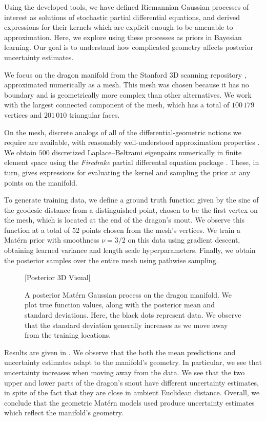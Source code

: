 \documentclass[11pt]{book}
\begin{document}
Using the developed tools, we have defined Riemannian Gaussian processes of interest as solutions of stochastic partial differential equations, and derived expressions for their kernels which are explicit enough to be amenable to approximation. 
Here, we explore using these processes as priors in Bayesian learning.
Our goal is to understand how complicated geometry affects posterior uncertainty estimates.

We focus on the dragon manifold from the Stanford 3D scanning repository \cite{curless96}, approximated numerically as a mesh.
This mesh was chosen because it has no boundary and is geometrically more complex than other alternatives.
We work with the largest connected component of the mesh, which has a total of $100\,179$ vertices and $201\,010$ triangular faces.

On the mesh, discrete analogs of all of the differential-geometric notions we require are available, with reasonably well-understood approximation properties \cite{crane17}.
We obtain $500$ discretized Laplace--Beltrami eigenpairs numerically in finite element space using the \emph{Firedrake} partial differental equation package \cite{rathgeber16}.
These, in turn, gives expressions for evaluating the kernel and sampling the prior at any points on the manifold.

To generate training data, we define a ground truth function given by the sine of the geodesic distance from a distinguished point, chosen to be the first vertex on the mesh, which is located at the end of the dragon's snout.
We observe this function at a total of $52$ points chosen from the mesh's vertices.
We train a Matérn prior with smoothness $\nu = 3/2$ on this data using gradient descent, obtaining learned variance and length scale hyperparameters.
Finally, we obtain the posterior samples over the entire mesh using pathwise sampling.

\begin{figure}
\vspace*{10ex}
[Posterior 3D Visual]
\vspace*{10ex}
\caption{A posterior Matérn Gaussian process on the dragon manifold. We plot true function values, along with the posterior mean and standard deviations. Here, the black dots represent data. We observe that the standard deviation generally increases as we move away from the training locations.}
\label{fig:dr-posterior}
\end{figure}

Results are given in .
We observe that the both the mean predictions and uncertainty estimates adapt to the manifold's geometry.
In particular, we see that uncertainty increases when moving away from the data.
We see that the two upper and lower parts of the dragon's snout have different uncertainty estimates, in spite of the fact that they are close in ambient Euclidean distance.
Overall, we conclude that the geometric Matérn models used produce uncertainty estimates which reflect the manifold's geometry.
\end{document}
